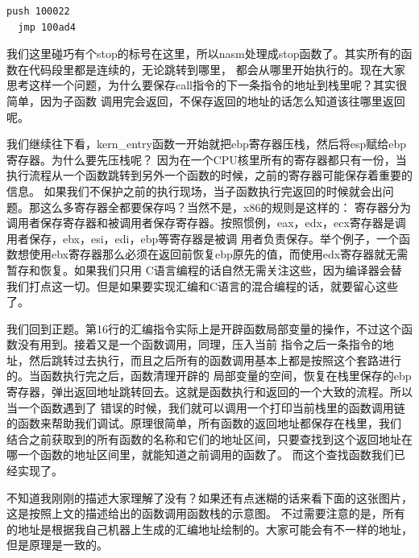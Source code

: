 \begin{Verbatim}[frame=single]
  push 100022
  jmp 100ad4
\end{Verbatim}

\par 我们这里碰巧有个stop的标号在这里，所以nasm处理成stop函数了。其实所有的函数在代码段里都是连续的，无论跳转到哪里，\allowbreak
都会从哪里开始执行的。现在大家思考这样一个问题，为什么要保存call指令的下一条指令的地址到栈里呢？其实很简单，因为子函数\allowbreak
调用完会返回，不保存返回的地址的话怎么知道该往哪里返回呢。

\par 我们继续往下看，kern\_entry函数一开始就把ebp寄存器压栈，然后将esp赋给ebp寄存器。为什么要先压栈呢？\allowbreak
因为在一个CPU核里所有的寄存器都只有一份，当执行流程从一个函数跳转到另外一个函数的时候，之前的寄存器可能保存着重要的信息。\allowbreak
如果我们不保护之前的执行现场，当子函数执行完返回的时候就会出问题。那这么多寄存器全都要保存吗？当然不是，x86的规则是这样的：\allowbreak
寄存器分为调用者保存寄存器和被调用者保存寄存器。按照惯例，eax，edx，ecx寄存器是调用者保存，ebx，esi，edi，ebp等寄存器是被调\allowbreak
用者负责保存。举个例子，一个函数想使用ebx寄存器那么必须在返回前恢复ebp原先的值，而使用edx寄存器就无需暂存和恢复。如果我们只用\allowbreak
C语言编程的话自然无需关注这些，因为编译器会替我们打点这一切。但是如果要实现汇编和C语言的混合编程的话，就要留心这些了。

\par 我们回到正题。第16行的汇编指令实际上是开辟函数局部变量的操作，不过这个函数没有用到。接着又是一个函数调用，同理，压入当前\allowbreak
指令之后一条指令的地址，然后跳转过去执行，而且之后所有的函数调用基本上都是按照这个套路进行的。当函数执行完之后，函数清理开辟的\allowbreak
局部变量的空间，恢复在栈里保存的ebp寄存器，弹出返回地址跳转回去。这就是函数执行和返回的一个大致的流程。所以当一个函数遇到了\allowbreak
错误的时候，我们就可以调用一个打印当前栈里的函数调用链的函数来帮助我们调试。原理很简单，所有函数的返回地址都保存在栈里，我们\allowbreak
结合之前获取到的所有函数的名称和它们的地址区间，只要查找到这个返回地址在哪一个函数的地址区间里，就能知道之前调用的函数了。\allowbreak
而这个查找函数我们已经实现了。

\par 不知道我刚刚的描述大家理解了没有？如果还有点迷糊的话来看下面的这张图片，这是按照上文的描述给出的函数调用函数栈的示意图。\allowbreak
不过需要注意的是，所有的地址是根据我自己机器上生成的汇编地址绘制的。大家可能会有不一样的地址，但是原理是一致的。

